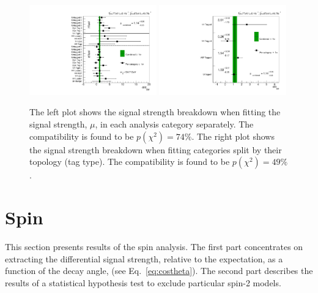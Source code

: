 \begin{figure}
  \includegraphics[width=0.49\textwidth]{results/plots/mva_chcomp.pdf}
  \includegraphics[width=0.49\textwidth]{results/plots/mva_topo_scan.pdf}
  \caption[The observed compatibility of the signal strength between channels]{The left plot shows the signal strength breakdown when fitting the signal strength, $\mu$, in each analysis category separately. The compatibility is found to be $p(\chi^{2})=74\%$. The right plot shows the signal strength breakdown when fitting categories split by their topology (tag type). The compatibility is found to be $p(\chi^{2})=49\%$.}
  \label{fig:res_chcomp}
\end{figure}

\section{Spin}
\label{sec:spin_results}

This section presents results of the spin analysis. The first part concentrates on extracting the differential signal strength, relative to the \SM expectation, as a function of the decay angle, \costhetastar (see Eq.~\ref{eq:costheta}). The second part describes the results of a statistical hypothesis test to exclude particular spin-2 models.

